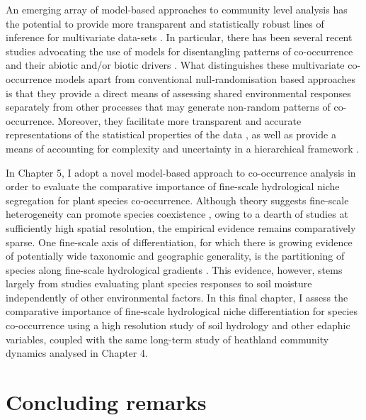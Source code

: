 An emerging array of model-based approaches to community level analysis has the potential to provide more transparent and statistically robust lines of inference for multivariate data-sets \citep{Ovaskainen2010, Ives2011, Warton2012, Clark2013, Pollock2014, Hui2014, Harris2015}. In particular, there has been several recent studies advocating the use of models for disentangling patterns of co-occurrence and their abiotic and/or biotic drivers \citep{Ovaskainen2010, Pollock2014, Harris2015}. What distinguishes these multivariate co-occurrence models apart from conventional null-randomisation based approaches is that they provide a direct means of assessing shared environmental responses separately from other processes that may generate non-random patterns of co-occurrence. Moreover, they facilitate more transparent and accurate representations of the statistical properties of the data \citep[e.g. overdispersion of counts,][]{Warton2012}, as well as provide a means of accounting for complexity and uncertainty in a hierarchical framework \citep{Cressie2009}.

In Chapter 5, I adopt a novel model-based approach to co-occurrence analysis in order to evaluate the comparative importance of fine-scale hydrological niche segregation for plant species co-occurrence. Although theory suggests fine-scale heterogeneity can promote species coexistence \citep{Chesson2000, Amarasekare2003, Snyder2004}, owing to a dearth of studies at sufficiently high spatial resolution, the empirical evidence remains comparatively sparse. One fine-scale axis of differentiation, for which there is growing evidence of potentially wide taxonomic and geographic generality, is the partitioning of species along fine-scale hydrological gradients \citep{Silvertown2015}. This evidence, however, stems largely from studies evaluating plant species responses to soil moisture independently of other environmental factors.  In this final chapter, I assess the comparative importance of fine-scale hydrological niche differentiation for species co-occurrence using a high resolution study of soil hydrology and other edaphic variables, coupled with the same long-term study of heathland community dynamics analysed in Chapter 4.


\section{Concluding remarks}

